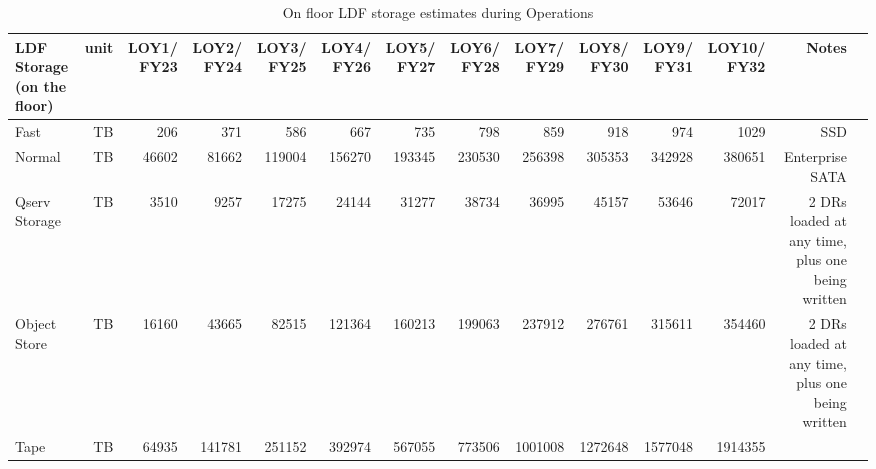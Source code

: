 \tiny \begin{longtable} { |p{}  |r  |r  |r  |r  |r  |r  |r  |r  |r  |r  |r  |r  |r |} 
\caption{On floor LDF storage estimates during Operations
 \label{tab:storageFloorOps}}\\ 
\hline 
\textbf{LDF Storage (on the floor)}&\textbf{unit}&\textbf{LOY1/ FY23}&\textbf{LOY2/ FY24}&\textbf{LOY3/ FY25}&\textbf{LOY4/ FY26}&\textbf{LOY5/ FY27}&\textbf{LOY6/ FY28}&\textbf{LOY7/ FY29}&\textbf{LOY8/ FY30}&\textbf{LOY9/ FY31}&\textbf{LOY10/ FY32}&\textbf{Notes} \\ \hline
{Fast}&{TB}&{206}&{371}&{586}&{667}&{735}&{798}&{859}&{918}&{974}&{1029}&{SSD} \\ \hline
{Normal}&{TB}&{46602}&{81662}&{119004}&{156270}&{193345}&{230530}&{256398}&{305353}&{342928}&{380651}&{Enterprise SATA} \\ \hline
{Qserv Storage}&{TB}&{3510}&{9257}&{17275}&{24144}&{31277}&{38734}&{36995}&{45157}&{53646}&{72017}&{2 DRs loaded at any time, plus one being written} \\ \hline
{Object Store}&{TB}&{16160}&{43665}&{82515}&{121364}&{160213}&{199063}&{237912}&{276761}&{315611}&{354460}&{2 DRs loaded at any time, plus one being written} \\ \hline
{Tape}&{TB}&{64935}&{141781}&{251152}&{392974}&{567055}&{773506}&{1001008}&{1272648}&{1577048}&{1914355}& \\ \hline
\end{longtable} \normalsize
